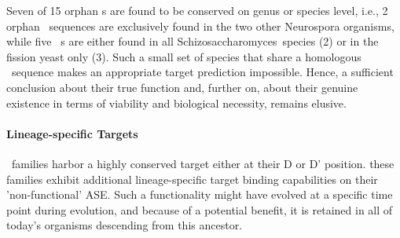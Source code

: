 Seven of 15 orphan \haca s are found to be conserved  on genus or
species level, i.e., 2 orphan \ncr\ sequences are exclusively found in the
two other Neurospora organisms, while five \spo\ \sno s are either found in
all Schizosaccharomyces\ species (2) or in the fission yeast only (3). Such
a small set of species that share a homologous \sno\ sequence makes an
appropriate target prediction impossible. Hence, a sufficient conclusion
about their true function and, further on, about their genuine existence in
terms of viability and biological necessity, remains elusive.

\paragraph{\textbf{Lineage-specific Targets}}
 \cd\ families harbor a highly conserved target either at
their D or D' position. 
these families exhibit additional lineage-specific target binding
capabilities on their 'non-functional' ASE. Such a functionality might have
evolved at a specific time point during evolution, and because of a
potential benefit, it is retained in all of today's organisms descending
from this ancestor.

